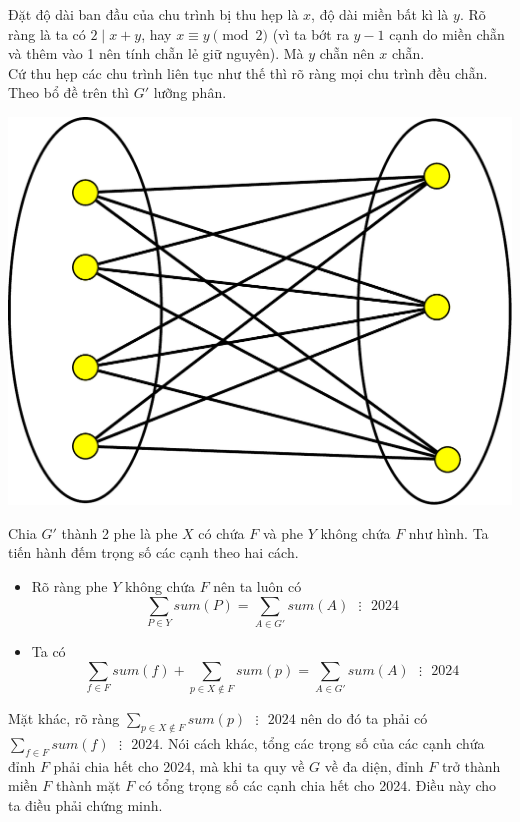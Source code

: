 \documentclass[11pt]{scrartcl}
\begin{document}
\begin{itemize}[label=, leftmargin=0em, itemsep=0.5em]
\begin{sol}
        Đặt độ dài ban đầu của chu trình bị thu hẹp là $x$, độ dài miền bất kì là $y$. Rõ ràng là ta có $2 \mid x + y$, hay $x \equiv y \pmod 2$ (vì ta bớt ra $y-1$ cạnh do miền chẵn và thêm vào 1 nên tính chẵn lẻ giữ nguyên). Mà $y$ chẵn nên $x$ chẵn. \\
        Cứ thu hẹp các chu trình liên tục như thế thì rõ ràng mọi chu trình đều chẵn. Theo bổ đề trên thì $G'$ lưỡng phân.


        \begin{center}
            \includegraphics[scale=0.25]{kphec.pdf}
        \end{center}
        Chia $G'$ thành 2 phe là phe $X$ có chứa $F$ và phe $Y$ không chứa $F$ như hình. Ta tiến hành đếm trọng số các cạnh theo hai cách.
        \begin{itemize}[label=]
            \item {}   Rõ ràng phe $Y$ không chứa $F$ nên ta luôn có $$\sum_{P \in Y} sum(P) = \sum_{A \in G'}sum(A) \text{ } \vdots \text{ }2024$$
            \item {}  Ta có 
            $$\sum_{f \in F}sum(f) + \sum_{p \in X \notin F}sum(p) =  \sum_{A \in G'}sum(A) \text{ } \vdots \text{ }2024
            $$
        \end{itemize}
        Mặt khác, rõ ràng $\displaystyle  \sum_{p \in X \notin F}sum(p)\text{ } \vdots \text{ }2024$ nên do đó ta phải có $\displaystyle\sum_{f \in F}sum(f) \text{ } \vdots \text{ }2024$. Nói cách khác, tổng các trọng số của các cạnh chứa đỉnh $F$ phải chia hết cho 2024, mà khi ta quy về $G$ về đa diện, đỉnh $F$ trở thành miền $F$ thành mặt $F$ có tổng trọng số các cạnh chia hết cho 2024. Điều này cho ta điều phải chứng minh. 

\end{sol}
\end{itemize}
\end{document}
